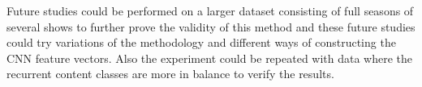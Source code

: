 \documentclass{report}
\begin{document}
Future studies could be performed on a larger dataset consisting of full seasons of several shows to further prove the validity of this method and these future studies could try variations of the methodology and different ways of constructing the CNN feature vectors. Also the experiment could be repeated with data where the recurrent content classes are more in balance to verify the results.

\end{document}
